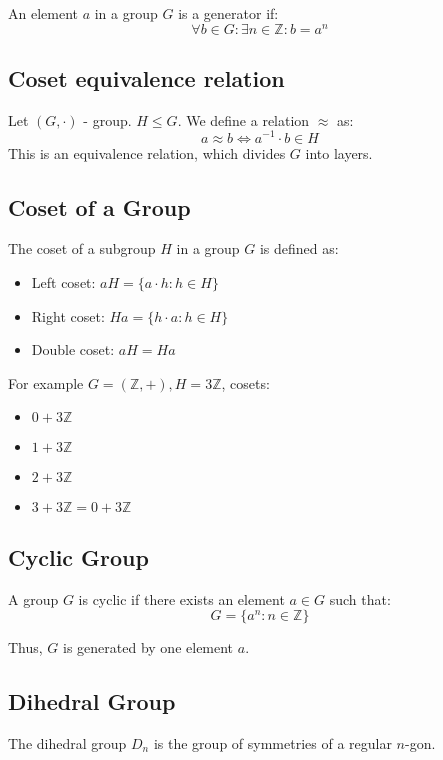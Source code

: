 \documentclass{article}
\begin{document}
An element \( a \) in a group \( G \) is a generator if:
\[ \forall b \in G: \exists n \in \mathbb{Z}: b = a^n \]

\subsection{Coset equivalence relation}

Let \((G,\cdot)\) - group. \( H \leq G \). We define a relation \(\approx\) as:
\[
a \approx b \iff a^{-1} \cdot b \in H
\]
This is an equivalence relation, which divides $G$ into layers.

\subsection{Coset of a Group}

The coset of a subgroup \( H \) in a group \( G \) is defined as:
\begin{itemize}
    \item Left coset: \( aH = \{ a \cdot h : h \in H \} \)
    \item Right coset: \( Ha = \{ h \cdot a : h \in H \} \)
    \item Double coset: \( aH = Ha \)
\end{itemize}
For example \(G=(\mathbb{Z},+), H=3\mathbb{Z}\), cosets:
\begin{itemize}
    \item \( 0 + 3\mathbb{Z}\)
    \item \( 1 + 3\mathbb{Z}\)
    \item \( 2 + 3\mathbb{Z}\)
    \item \( 3 + 3\mathbb{Z} = 0 + 3\mathbb{Z}\)
\end{itemize}

\subsection{Cyclic Group}

A group \( G \) is cyclic if there exists an element \( a \in G \) such that:
\[ G = \{ a^n : n \in \mathbb{Z} \} \]

Thus, \( G \) is generated by one element \( a \).

\subsection{Dihedral Group}

The dihedral group \( D_n \) is the group of symmetries of a regular \( n \)-gon.
\end{document}
